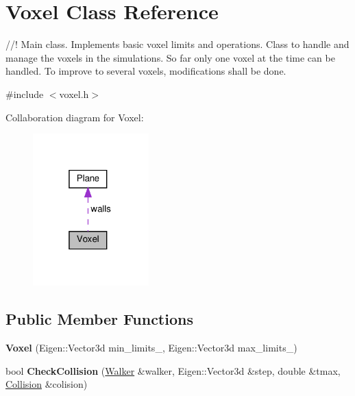 \hypertarget{class_voxel}{}\section{Voxel Class Reference}
\label{class_voxel}


//! Main class. Implements basic voxel limits and operations. Class to handle and manage the voxels in the simulations. So far only one voxel at the time can be handled. To improve to several voxels, modifications shall be done.  




{\ttfamily \#include $<$voxel.\+h$>$}



Collaboration diagram for Voxel\+:\nopagebreak
\begin{figure}[H]
\begin{center}
\leavevmode
\includegraphics[width=127pt]{class_voxel__coll__graph}
\end{center}
\end{figure}
\subsection*{Public Member Functions}
\begin{DoxyCompactItemize}
\item 
\mbox{\label{class_voxel_acbb05a2f277a8ae7c59119eb3adf7e8c}} 
{\bfseries Voxel} (Eigen\+::\+Vector3d min\+\_\+limits\+\_\+, Eigen\+::\+Vector3d max\+\_\+limits\+\_\+)
\item 
\mbox{\label{class_voxel_af52a1ec58a5244591c56963b28192748}} 
bool {\bfseries Check\+Collision} (\hyperlink{class_walker}{Walker} \&walker, Eigen\+::\+Vector3d \&step, double \&tmax, \hyperlink{class_collision}{Collision} \&colision)
\end{DoxyCompactItemize}
